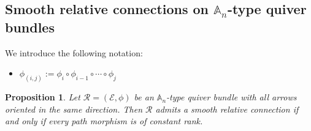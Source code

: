 \documentclass[12pt, reqno]{amsart}
\theoremstyle{plain}
\newtheorem{proposition}[theorem]{Proposition}
\numberwithin{equation}{section}
\begin{document}
\subsection{Smooth relative connections on $\mathbb{A}_n$-type quiver bundles}\label{S:A_n conn}
We introduce the following notation:
\begin{itemize}
    \item $\phi_{(i,j)}:=\phi_i \circ \phi_{i-1}\circ \cdots \circ \phi_j$
    
\end{itemize}

\begin{proposition}\label{T:A_n case}
Let $\mathcal{R}=(\mathcal{E},\phi)$ be an $\mathbb{A}_n$-type quiver bundle with all arrows oriented in the same direction. Then $\mathcal{R}$ admits a smooth relative connection if and only if every path morphism is of constant rank.
  
\end{proposition}
\end{document}
